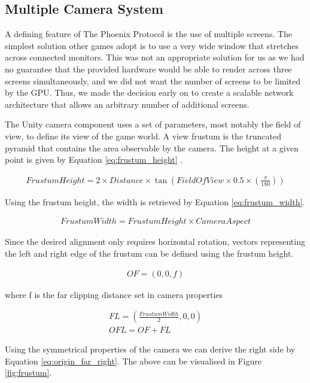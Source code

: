 \documentclass[a4paper,11pt]{article}
\begin{document}
\subsection{Multiple Camera System}
A defining feature of The Phoenix Protocol is the use of multiple screens. The simplest solution other games adopt is to use a very wide window that stretches across connected monitors. This was not an appropriate solution for us as we had no guarantee that the provided hardware would be able to render across three screens simultaneously, and we did not want the number of screens to be limited by the GPU. Thus, we made the decision early on to create a scalable network architecture that allows an arbitrary number of additional screens. 

The Unity camera component uses a set of parameters, most notably the field of view, to define its view of the game world. A view frustum \cite{unity_frustum} is the truncated pyramid that contains the area observable by the camera. The height at a given point is given by Equation \ref{eq:frustum_height} \cite{frustum_equations}.

\begin{align}
	Frustum Height = 2 \times Distance \times \tan \left( Field Of View \times 0.5 \times \left( \frac{\pi}{180} \right)\right) \label{eq:frustum_height}
\end{align}

Using the frustum height, the width is retrieved by Equation \ref{eq:frustum_width}.

\begin{align}
	Frustum Width = Frustum Height \times Camera Aspect \label{eq:frustum_width}
\end{align}

Since the desired alignment only requires horizontal rotation, vectors representing the left and right edge of the frustum can be defined using the frustum height.

\begin{align*}
	OF = (0, 0, f)
\end{align*}

where f is the far clipping distance set in camera properties

\begin{gather*}
	FL  = \left( \frac{Frustum Width}{2}, 0, 0 \right) \\
	OFL = OF + FL
\end{gather*}

Using the symmetrical properties of the camera we can derive the right side by Equation \ref{eq:origin_far_right}. The above can be visualised in Figure \ref{fig:frustum}.
\end{document}
